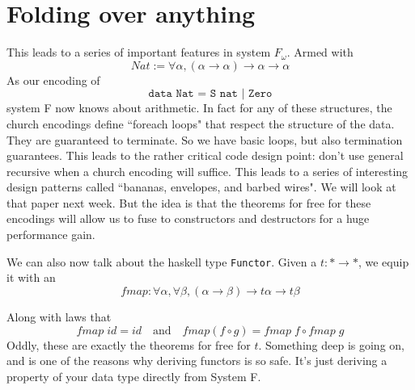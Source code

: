 \documentclass[12pt]{article}
\newcommand{\hask}{\texttt}
\begin{document}
\section{Folding over anything}
This leads to a series of important features in system $F_\omega$.
Armed with
\[
  Nat := \forall \alpha, (\alpha \rightarrow \alpha) \rightarrow \alpha \rightarrow \alpha
\]
As our encoding of
\[
\hask{data Nat = S nat | Zero}
\]
system F now knows about arithmetic.
In fact for any of these structures, the church encodings define ``foreach loops" that respect the structure of the data.
They are guaranteed to terminate. 
So we have basic loops, but also termination guarantees.
This leads to the rather critical code design point: don't use general recursive when a church encoding will suffice.  This leads to a series of interesting design patterns called ``bananas, envelopes, and barbed wires".
We will look at that paper next week.
But the idea is that the theorems for free for these encodings will allow us to fuse to constructors and destructors for a huge performance gain. 

We can also now talk about the haskell type \hask{Functor}.
Given a $t : * \rightarrow *$, we equip it with an 
\[
  fmap : \forall \alpha, \forall \beta, (\alpha \rightarrow \beta) \rightarrow t \alpha \rightarrow t\beta
\]

Along with laws that 
\[
   fmap\; id = id\quad\text{and}\quad fmap (f \circ g) = fmap\; f \circ fmap\; g
\]
Oddly, these are exactly the theorems for free for $t$.
Something deep is going on, and is one of the reasons why deriving functors is so safe.
It's just deriving a property of your data type directly from System F.
\end{document}
